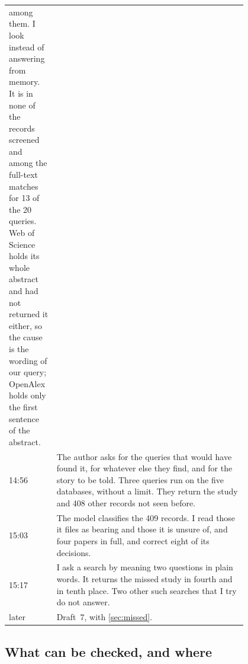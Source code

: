 \begin{table}
\begin{sidecaption}
\begin{tabular}{@{}lL{0.80\linewidth}@{}}
        among them.
        I look instead of answering from memory.
        It is in none of the records screened and among the full-text
        matches for 13 of the 20 queries.
        Web of Science holds its whole abstract and had not returned it
        either, so the cause is the wording of our query; OpenAlex holds
        only the first sentence of the abstract. \\
      14:56 & The author asks for the queries that would have found it,
        for whatever else they find, and for the story to be told.
        Three queries run on the five databases, without a limit.
        They return the study and 408 other records not seen before. \\
      15:03 & The model classifies the 409 records.
        I read those it files as bearing and those it is unsure of, and
        four papers in full, and correct eight of its decisions. \\
      15:17 & I ask a search by meaning two questions in plain words.
        It returns the missed study in fourth and in tenth place.
        Two other such searches that I try do not answer. \\
      later & Draft~7, with \cref{sec:missed}. \\
      \bottomrule
    \end{tabular}
  \end{sidecaption}
\end{table}

\subsection{What can be checked, and where}\label{sec:audit}

